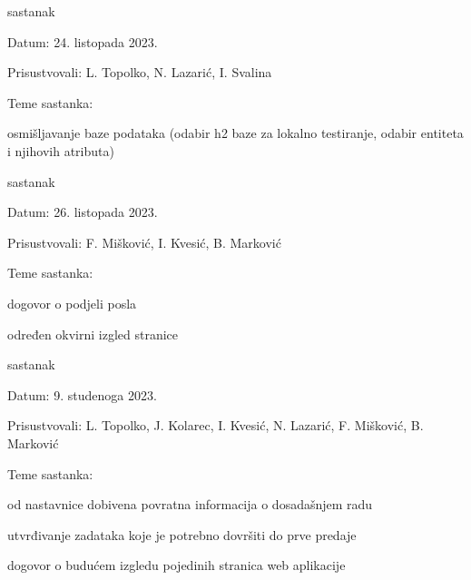 \begin{packed_enum}
			\item  sastanak
			\item[] \begin{packed_item}
				\item Datum: 24. listopada 2023.
				\item Prisustvovali: L. Topolko, N. Lazarić, I. Svalina
				\item Teme sastanka:
				\begin{packed_item}
					\item  osmišljavanje baze podataka (odabir h2 baze za lokalno testiranje, odabir entiteta i njihovih atributa)
				\end{packed_item}
			\end{packed_item}
			
			\item  sastanak
			\item[] \begin{packed_item}
				\item Datum: 26. listopada 2023.
				\item Prisustvovali: F. Mišković, I. Kvesić, B. Marković
				\item Teme sastanka:
				\begin{packed_item}
					\item  dogovor o podjeli posla
					\item  određen okvirni izgled stranice
				\end{packed_item}
			\end{packed_item}
		
		
			\item  sastanak
			\item[] \begin{packed_item}
				\item Datum: 9. studenoga 2023.
				\item Prisustvovali: L. Topolko, J. Kolarec, I. Kvesić, N. Lazarić, F. Mišković, B. Marković
				\item Teme sastanka:
				\begin{packed_item}
					\item  od nastavnice dobivena povratna informacija o dosadašnjem radu 
					\item  utvrđivanje zadataka koje je potrebno dovršiti do prve predaje 
					\item dogovor o budućem izgledu pojedinih stranica web aplikacije
				\end{packed_item}
			\end{packed_item}
			

\end{packed_enum}
